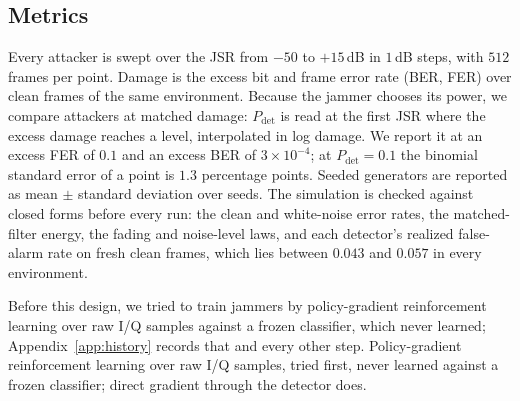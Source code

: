 \subsection{Metrics}\label{sec:method:metrics}
Every attacker is swept over the JSR from $-50$ to $+15$\,dB in $1$\,dB steps, with $512$ frames per point.
Damage is the excess bit and frame error rate (BER, FER) over clean frames of the same environment.
Because the jammer chooses its power, we compare attackers at matched damage: $P_{\mathrm{det}}$ is read at the first JSR where the excess damage reaches a level, interpolated in log damage.
We report it at an excess FER of $0.1$ and an excess BER of $3\times10^{-4}$; at $P_{\mathrm{det}}=0.1$ the binomial standard error of a point is $1.3$ percentage points.
Seeded generators are reported as mean $\pm$ standard deviation over seeds.
The simulation is checked against closed forms before every run: the clean and white-noise error rates, the matched-filter energy, the fading and noise-level laws, and each detector's realized false-alarm rate on fresh clean frames, which lies between $0.043$ and $0.057$ in every environment.

\ifthesis
Before this design, we tried to train jammers by policy-gradient reinforcement learning over raw I/Q samples against a frozen classifier, which never learned; Appendix~\ref{app:history} records that and every other step.
\else
Policy-gradient reinforcement learning over raw I/Q samples, tried first, never learned against a frozen classifier; direct gradient through the detector does.
\fi
